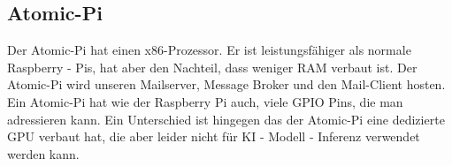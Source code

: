 \subsection{Atomic-Pi}
Der Atomic-Pi hat einen x86-Prozessor. Er ist leistungsfähiger als normale Raspberry - Pis, hat aber den Nachteil, dass weniger RAM verbaut ist. Der Atomic-Pi wird unseren Mailserver, Message Broker und den Mail-Client hosten. Ein Atomic-Pi hat wie der Raspberry Pi auch, viele GPIO Pins, die man adressieren kann. Ein Unterschied ist hingegen das der Atomic-Pi eine dedizierte GPU verbaut hat, die aber leider nicht für KI - Modell - Inferenz verwendet werden kann.
